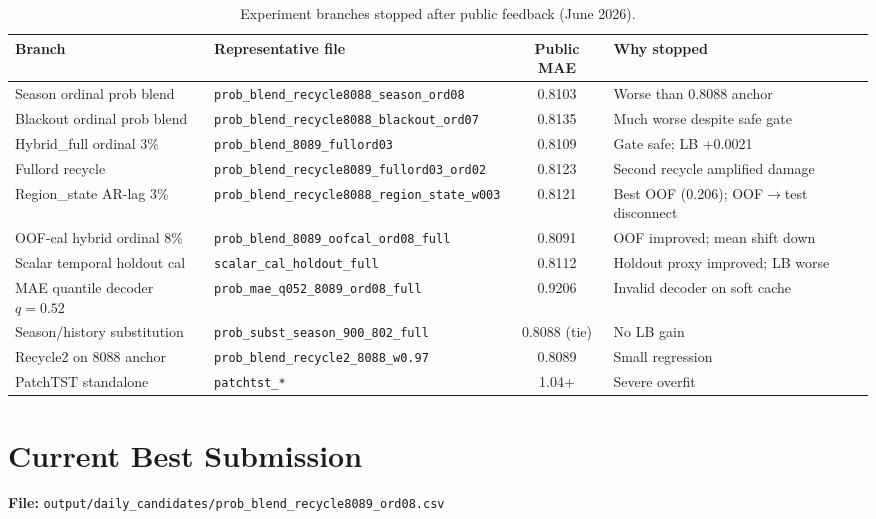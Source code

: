 \documentclass[12pt, a4paper]{article}
\begin{document}
\begin{table}[H]
\centering
\caption{Experiment branches stopped after public feedback (June 2026).}
\label{tab:stopped}
\begin{tabular}{@{}llcl@{}}
\toprule
\textbf{Branch} & \textbf{Representative file} & \textbf{Public MAE} & \textbf{Why stopped} \\
\midrule
Season ordinal prob blend & \texttt{prob\_blend\_recycle8088\_season\_ord08} & 0.8103 & Worse than 0.8088 anchor \\
Blackout ordinal prob blend & \texttt{prob\_blend\_recycle8088\_blackout\_ord07} & 0.8135 & Much worse despite safe gate \\
Hybrid\_full ordinal 3\% & \texttt{prob\_blend\_8089\_fullord03} & 0.8109 & Gate safe; LB +0.0021 \\
Fullord recycle & \texttt{prob\_blend\_recycle8089\_fullord03\_ord02} & 0.8123 & Second recycle amplified damage \\
Region\_state AR-lag 3\% & \texttt{prob\_blend\_recycle8088\_region\_state\_w003} & 0.8121 & Best OOF (0.206); OOF$\rightarrow$test disconnect \\
OOF-cal hybrid ordinal 8\% & \texttt{prob\_blend\_8089\_oofcal\_ord08\_full} & 0.8091 & OOF improved; mean shift down \\
Scalar temporal holdout cal & \texttt{scalar\_cal\_holdout\_full} & 0.8112 & Holdout proxy improved; LB worse \\
MAE quantile decoder $q{=}0.52$ & \texttt{prob\_mae\_q052\_8089\_ord08\_full} & 0.9206 & Invalid decoder on soft cache \\
Season/history substitution & \texttt{prob\_subst\_season\_900\_802\_full} & 0.8088 (tie) & No LB gain \\
Recycle2 on 8088 anchor & \texttt{prob\_blend\_recycle2\_8088\_w0.97} & 0.8089 & Small regression \\
PatchTST standalone & \texttt{patchtst\_*} & 1.04+ & Severe overfit \\
\bottomrule
\end{tabular}
\end{table}

\section{Current Best Submission}

\textbf{File:} \texttt{output/daily\_candidates/prob\_blend\_recycle8089\_ord08.csv}
\end{document}

